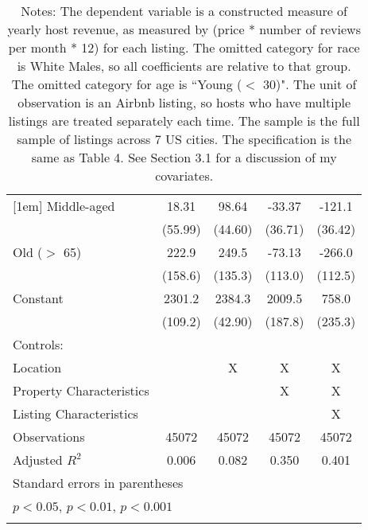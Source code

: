 {\begin{longtable}{l*{4}{c}}
[1em]
Middle-aged         &       18.31         &       98.64\sym{*}  &      -33.37         &      -121.1\sym{***}\\
                    &     (55.99)         &     (44.60)         &     (36.71)         &     (36.42)         \\
[1em]
Old ($>$ 65)                 &       222.9         &       249.5         &      -73.13         &      -266.0\sym{*}  \\
                    &     (158.6)         &     (135.3)         &     (113.0)         &     (112.5)         \\
[1em]
Constant            &      2301.2\sym{***}&      2384.3\sym{***}&      2009.5\sym{***}&       758.0\sym{**} \\
                    &     (109.2)         &     (42.90)         &     (187.8)         &     (235.3)         \\
\hline
Controls:        \\
\hspace{3mm} Location  &                &       X         &       X         &       X         \\
\hspace{3mm} Property Characteristics  &                &                &       X         &       X         \\
\hspace{3mm} Listing Characteristics  &                &                &                &       X         \\
\hline
Observations        &       45072         &       45072         &       45072         &       45072         \\
Adjusted \(R^{2}\)  &       0.006         &       0.082         &       0.350         &       0.401         \\
\hline\hline
\multicolumn{5}{l}{\footnotesize Standard errors in parentheses}\\
\multicolumn{5}{l}{\footnotesize \sym{*} \(p<0.05\), \sym{**} \(p<0.01\), \sym{***} \(p<0.001\)}\\
\caption*{Notes: The dependent variable is a constructed measure of yearly host revenue, as measured by (price * number of reviews per month * 12) for each listing. The omitted category for race is White Males, so all coefficients are relative to that group. The omitted category for age is ``Young ($<$ 30)". The unit of observation is an Airbnb listing, so hosts who have multiple listings are treated separately each time. The sample is the full sample of listings across 7 US cities. The specification is the same as Table 4. See Section 3.1 for a discussion of my covariates. }
\end{longtable}
}


